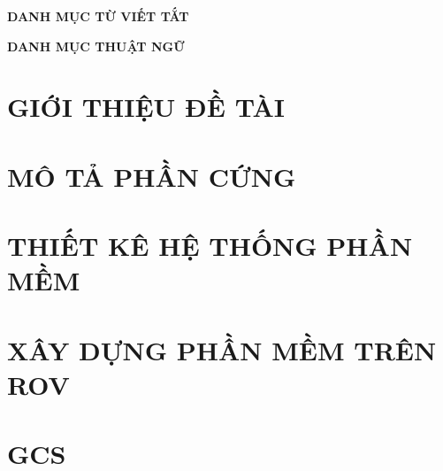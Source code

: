 \documentclass[a4paper,13pt,3p,twoside]{report}
\theoremstyle{definition}
\begin{document}
\newpage
\begin{center}
    \Large{\textbf{DANH MỤC TỪ VIẾT TẮT}}
\end{center}

{}

\newpage
\begin{center}
    \Large{\textbf{DANH MỤC THUẬT NGỮ}}
\end{center}

{}


\newpage

% 


\newpage
{}

\pagestyle{fancy}
\fancyhf{}
\fancyhead[RE, LO]{\leftmark}
\fancyfoot[RE, LO]{\thepage}

\chapter{GIỚI THIỆU ĐỀ TÀI}
\label{chapter:Introduction}

\newpage
\chapter{MÔ TẢ PHẦN CỨNG}
\label{chapter:Related_works}



\newpage
\chapter{THIẾT KÊ HỆ THỐNG PHẦN MỀM}
\label{chapter:Methodology}


\newpage
\chapter{XÂY DỰNG PHẦN MỀM TRÊN ROV}
\label{chapter:Experiment}



\newpage
\chapter{GCS}
\label{chapter:SolutionAndContribution}

\end{document}
